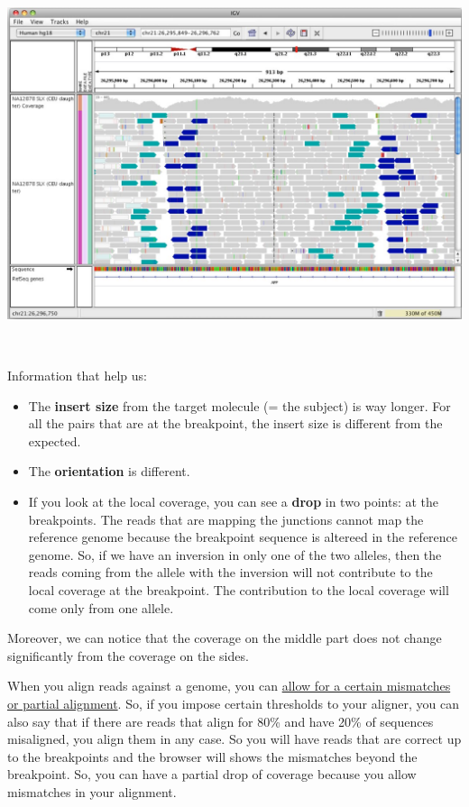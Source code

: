 \includegraphics[width=6.29861in,height=4.32833in]{image22.jpeg}


Information that help us:

\begin{itemize}
  \item The \textbf{insert size} from the target molecule (= the subject) is way
  longer. For all the pairs that are at the breakpoint, the insert size is
  different from the expected.

  \item The \textbf{orientation} is different.
  
  \item If you look at the local coverage, you can see a \textbf{drop} in two
  points: at the breakpoints. The reads that are mapping the junctions cannot
  map the reference genome because the breakpoint sequence is altereed in the
  reference genome. So, if we have an inversion in only one of the two alleles,
  then the reads coming from the allele with the inversion will not contribute
  to the local coverage at the breakpoint. The contribution to the local
  coverage will come only from one allele.
\end{itemize}


Moreover, we can notice that the coverage on the middle part does not change
significantly from the coverage on the sides.

When you align reads against a genome, you can \underline{allow for a certain
mismatches or partial alignment}. So, if you impose certain thresholds to your
aligner, you can also say that if there are reads that align for 80\% and have
20\% of sequences misaligned, you align them in any case. So you will have reads
that are correct up to the breakpoints and the browser will shows the mismatches
beyond the breakpoint. So, you can have a partial drop of coverage because you
allow mismatches in your alignment.


